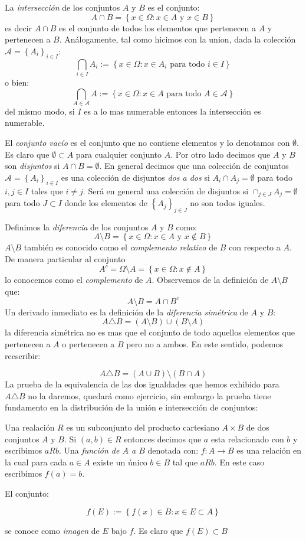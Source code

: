 \documentclass[14pt]{extbook}
\begin{document}
La \emph{intersección} de los conjuntos $A$ y $B$ es el conjunto:
$$
A\cap B = \left\{x\in \Omega: x \in A \text{ y } x \in B\right\}
$$
es decir $A\cap B$ es el conjunto de todos los elementos que pertenecen a $A$ y pertenecen a $B$. Análogamente, tal como hicimos con la union, dada la colección $\mathcal{A} = \left\{A_i\right\}_{i\in I}$:
$$
\bigcap_{i\in I}A_i := \left\{x\in \Omega: x \in A_i \text{ para todo } i\in I \right\}
$$
\noindent
o bien:
\noindent
$$
\bigcap_{A\in \mathcal{A}}A := \left\{x\in \Omega: x \in A \text{ para todo } A\in \mathcal{A} \right\}
$$
del mismo modo, si $I$ es a lo mas numerable entonces la intersección es numerable.

El \emph{conjunto vacío} es el conjunto que no contiene elementos y lo denotamos con $\emptyset$. Es claro que $\emptyset \subset A$ para cualquier conjunto $A$. Por otro lado decimos que $A$ y $B$ son \emph{disjuntos} si $A\cap B = \emptyset$. En general decimos que una colección de conjuntos $\mathcal{A} = \left\{A_i\right\}_{i\in I}$ es una colección de disjuntos \emph{dos a dos} si $A_i\cap A_j = \emptyset$ para todo $i, j\in I$ tales que $i\neq j$. Será en general una colección de disjuntos si $\cap_{j\in J} A_j = \emptyset$ para todo $J \subset I$ donde los elementos de $\left\{A_j\right\}_{j\in J}$ no son todos iguales.

Definimos la \emph{diferencia} de los conjuntos $A$ y $B$ como:
$$
A\setminus B = \left\{x\in \Omega: x  \in A \text{ y } x\notin B\right\}
$$
$A\setminus B$ también es conocido como el \emph{complemento relativo} de $B$ con respecto a $A$. De manera particular al conjunto 
$$
A^c = \Omega\setminus A = \left\{x\in \Omega: x\notin A\right\}
$$
lo conocemos como el \emph{complemento} de $A$.
Observemos de la definición de $A\setminus B$ que:
$$
A\setminus B = A \cap B^c
$$
Un derivado inmediato es la definición de la \emph{diferencia simétrica} de $A$ y $B$:
$$
A\triangle B = (A\setminus B) \cup (B\setminus A)
$$
la diferencia simétrica no es mas que el conjunto de todo aquellos elementos que pertenecen a $A$ o pertenecen a $B$ pero no a ambos. En este sentido, podemos reescribir:

$$
A\triangle B = (A\cup B) \setminus (B\cap A)
$$
La prueba de la equivalencia de las dos igualdades que hemos exhibido para $A\triangle B$ no la daremos, quedará como ejercicio, sin embargo la prueba tiene fundamento en la distribución de la unión e intersección de conjuntos:

\noindent\hrulefill

Una realación $R$ es un subconjunto del producto cartesiano $A\times B$ de dos conjuntos $A$ y $B$. Si $(a,b)\in R$ entonces decimos que $a$ esta relacionado con $b$ y escribimos $aRb$. Una \emph{función de $A$ a $B$} denotada con: $f:A\to B$ es una relación en la cual para cada $a\in A$ existe un único $b\in B$ tal que $aRb$. En este caso escribimos $f(a) = b$.

El conjunto:

$$
f(E) := \left\{f(x)\in B: x\in E\subset A\right\} 
$$

se conoce como \emph{imagen} de $E$ bajo $f$.  Es claro que $f(E) \subset B$ 
\end{document}
